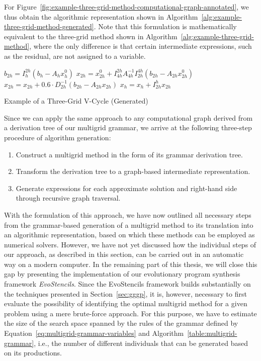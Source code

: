 For Figure~\ref{fig:example-three-grid-method-computational-graph-annotated}, we thus obtain the algorithmic representation shown in Algorithm~\ref{alg:example-three-grid-method-generated}.
Note that this formulation is mathematically equivalent to the three-grid method shown in Algorithm~\ref{alg:example-three-grid-method}, where the only difference is that certain intermediate expressions, such as the residual, are not assigned to a variable.
\begin{algorithm}
	\begin{algorithmic}[1]
		\State $ b_{2h} = I_{h}^{2h} \left(b_{h} - A_h x_{h}^0 \right)$
		\State $ x_{2h} = x^0_{2h} + I_{4h}^{2h} A_{4h}^{-1} I_{2h}^{4h} \left(b_{2h} - A_{2h} x^0_{2h}\right)$
		\State $ x_{2h} = x_{2h} + 0.6 \cdot D_{2h}^{-1} \left(b_{2h} - A_{2h} x_{2h}\right)$
		\State $x_{h} = x_{h}  + I_{2h}^h x_{2h}$
	\end{algorithmic}
	\caption{Example of a Three-Grid V-Cycle (Generated)}
	\label{alg:example-three-grid-method-generated}
\end{algorithm}
Since we can apply the same approach to any computational graph derived from a derivation tree of our multigrid grammar, we arrive at the following three-step procedure of algorithm generation:
\begin{enumerate}
	\item Construct a multigrid method in the form of its grammar derivation tree.
	\item Transform the derivation tree to a graph-based intermediate representation.
	\item Generate expressions for each approximate solution and right-hand side through recursive graph traversal.
\end{enumerate}
With the formulation of this approach, we have now outlined all necessary steps from the grammar-based generation of a multigrid method to its translation into an algorithmic representation, based on which these methods can be employed as numerical solvers.
However, we have not yet discussed how the individual steps of our approach, as described in this section, can be carried out in an automatic way on a modern computer.
In the remaining part of this thesis, we will close this gap by presenting the implementation of our evolutionary program synthesis framework \emph{EvoStencils}.
Since the EvoStencils framework builds substantially on the techniques presented in Section~\ref{sec:gggp}, it is, however, necessary to first evaluate the possibility of identifying the optimal multigrid method for a given problem using a mere brute-force approach.
For this purpose, we have to estimate the size of the search space spanned by the rules of the grammar defined by Equation~\eqref{eq:multigrid-grammar-variables} and Algorithm~\ref{table:multigrid-grammar}, i.e., the number of different individuals that can be generated based on its productions.

